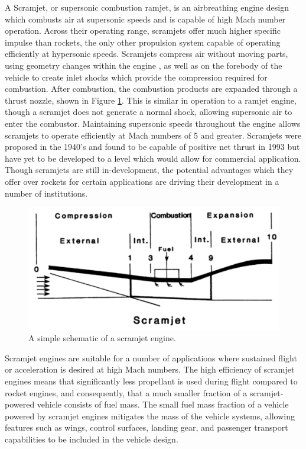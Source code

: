   
  A Scramjet, or supersonic combustion ramjet, is an airbreathing engine design which combusts air at supersonic speeds and is capable of high Mach number operation. 
      Across their operating range, scramjets offer much higher specific impulse than rockets, the only other propulsion system capable of operating efficiently at hypersonic speeds\cite{Billig1993,Cook2003}.
        Scramjets compress air without moving parts, using geometry changes within the engine \cite{Curran2001a}, as well as on the forebody of the vehicle to create inlet shocks which provide the compression required for combustion\cite{Smart2012}. After combustion, the combustion products are expanded through a thrust nozzle, shown in Figure \ref{fig:scramjet}. This is similar in operation to a ramjet engine, though a scramjet does not generate a normal shock, allowing supersonic air to enter the combustor. Maintaining supersonic speeds throughout the engine allows scramjets to operate efficiently at Mach numbers of 5 and greater. 
        Scramjets were proposed in the 1940's \cite{Curran2001} and found to be capable of positive net thrust in 1993 \cite{Paull1993} but have yet to be developed to a level which would allow for commercial application. 
        Though scramjets are still in-development, the potential advantages which they offer over rockets for certain applications are driving their development in a number of institutions\cite{Curran2001b}.
   \begin{figure}[ht]
   	\centering
   	\includegraphics[width=0.7\linewidth]{figures/2_literature-review/scramjet}
   	\caption{A simple schematic of a scramjet engine\cite{Heiser1994}.}
   	\label{fig:scramjet}
   \end{figure}
   
   Scramjet engines are suitable for a number of applications where sustained flight or acceleration is desired at high Mach numbers. 
   The high efficiency of scramjet engines means that significantly less propellant is used during flight compared to rocket engines, and consequently, that a much smaller fraction of a scramjet-powered vehicle consists of fuel mass\cite{Curran2003}. 
   The small fuel mass fraction of a vehicle powered by scramjet engines mitigates the mass of the vehicle systems, allowing features such as wings, control surfaces, landing gear, and passenger transport capabilities to be included in the vehicle design\cite{Curran2003}. 
   
